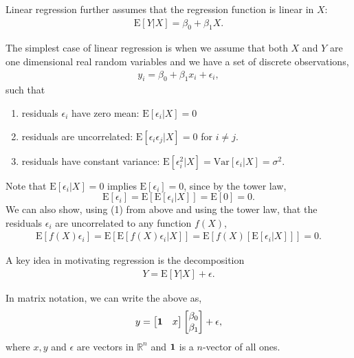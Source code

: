\documentclass{amsart}
\theoremstyle{plain}
\numberwithin{equation}{section}
\begin{document}
Linear regression further assumes that the regression function is linear in $X$:
\begin{align*}
\mathrm{E}[Y|X] = \beta_0 + \beta_1 X.
\end{align*}

The simplest case of linear regression is when 
we assume that both $X$ and $Y$ are one dimensional
real random variables and we have a set of 
discrete observations,
\begin{align*}
y_i = \beta_0 + \beta_1 x_i + \epsilon_i,
\end{align*}
such that
\begin{enumerate}
\item residuals $\epsilon_i$ have zero mean: $\mathrm{E}[\epsilon_i|X] = 0$
\item residuals are uncorrelated: 
$\mathrm{E}[\epsilon_i \epsilon_j |X] = 0$ for $i \neq j$.  
\item residuals have constant variance: $\mathrm{E}[\epsilon_i^2|X] = \mathrm{Var}[\epsilon_i|X] = \sigma^2$.
\end{enumerate} 

Note that $\mathrm{E}[\epsilon_i|X] = 0$ implies $\mathrm{E}[\epsilon_i]=0$,
since by the tower law,
$$\mathrm{E}[\epsilon_i] = \mathrm{E}[\mathrm{E}[\epsilon_i|X]] = \mathrm{E}[0]=0.$$
We can also show, using (1) from above and using the tower law, that the residuals
$\epsilon_i$ are uncorrelated to any 
function $f(X)$,
\begin{align*}
\mathrm{E}[f(X)\epsilon_i] = \mathrm{E}[\mathrm{E}[f(X)\epsilon_i|X]] = \mathrm{E}[f(X)[\mathrm{E}[\epsilon_i|X]]]=0.
\end{align*}

A key idea in motivating regression is the decomposition
\begin{align*}
Y = \mathrm{E}[Y|X] + \epsilon.
\end{align*}

In matrix notation, we can write the above as,
\begin{align*}
y = \begin{bmatrix}
{\bf 1} & x
\end{bmatrix}
\begin{bmatrix}
\beta_0\\
\beta_1
\end{bmatrix} + \epsilon,
\end{align*}
where $x, y$ and $\epsilon$ are vectors in $\mathbb{R}^n$ and 
${\bf 1}$ is a $n$-vector of all ones.
\end{document}
